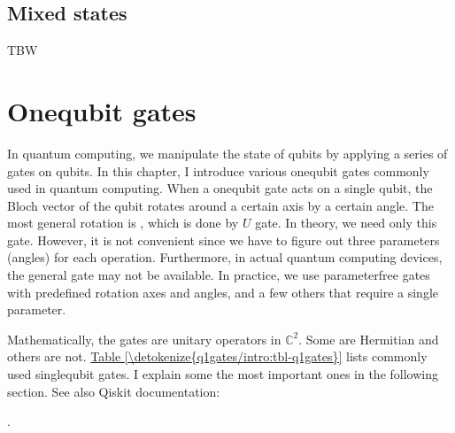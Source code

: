 \documentclass[letterpaper,10pt,english]{jupyterBook}
\begin{document}
\sphinxstepscope


\section{Mixed states}
\label{\detokenize{qubit/mixedstates:mixed-states}}\label{\detokenize{qubit/mixedstates:sec-mixedstates}}\label{\detokenize{qubit/mixedstates::doc}}
\sphinxAtStartPar
TBW

\sphinxstepscope


\chapter{One\sphinxhyphen{}qubit gates}
\label{\detokenize{q1gates/intro:one-qubit-gates}}\label{\detokenize{q1gates/intro:chap-one-qubit-gates}}\label{\detokenize{q1gates/intro::doc}}
\sphinxAtStartPar
In quantum computing, we manipulate the state of qubits by applying a series of gates on qubits. In this chapter, I introduce various one\sphinxhyphen{}qubit gates commonly used in quantum computing. When a one\sphinxhyphen{}qubit gate acts on a single qubit, the Bloch vector of the qubit rotates around a certain axis by a certain angle.  The most general rotation is , which is done by \(U\) gate.  In theory, we need only this gate. However, it is not convenient since we have to figure out three parameters (angles) for each operation.  Furthermore, in actual quantum computing devices, the general gate may not be available.   In practice, we use parameter\sphinxhyphen{}free gates with predefined rotation axes and angles, and a few others that require a single parameter.

\sphinxAtStartPar
Mathematically, the gates are unitary operators in \(\mathbb{C}^2\). Some are Hermitian and others are not.  \hyperref[\detokenize{q1gates/intro:tbl-q1gates}]{Table \ref{\detokenize{q1gates/intro:tbl-q1gates}}} lists commonly used single\sphinxhyphen{}qubit gates.  I explain some the most important ones in the following section.  See also Qiskit documentation:

\sphinxAtStartPar
{}.
\end{document}

